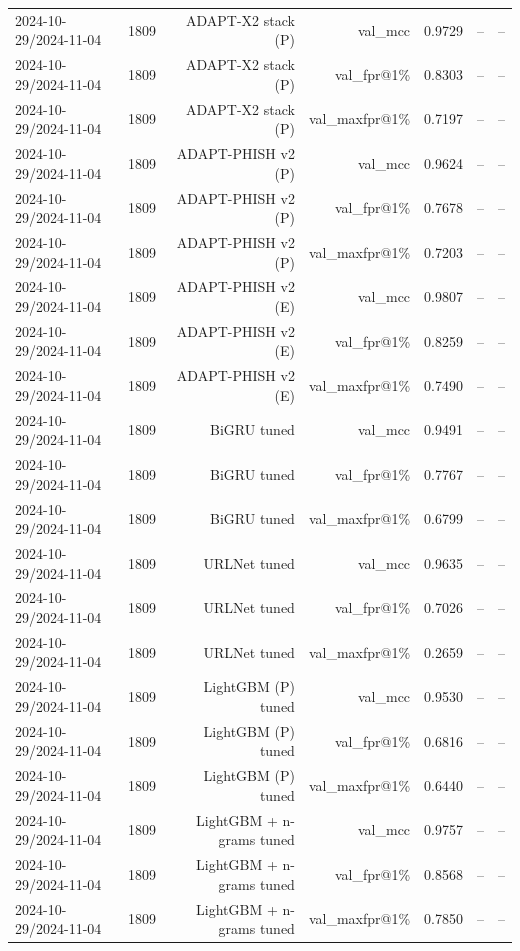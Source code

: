 \begin{table}[t]
\begin{tabular}{llrrrrr}
2024-10-29/2024-11-04 & 1809 & ADAPT-X2 stack (P) & val\_mcc & 0.9729 & -- & -- \\
2024-10-29/2024-11-04 & 1809 & ADAPT-X2 stack (P) & val\_fpr@1\% & 0.8303 & -- & -- \\
2024-10-29/2024-11-04 & 1809 & ADAPT-X2 stack (P) & val\_maxfpr@1\% & 0.7197 & -- & -- \\
2024-10-29/2024-11-04 & 1809 & ADAPT-PHISH v2 (P) & val\_mcc & 0.9624 & -- & -- \\
2024-10-29/2024-11-04 & 1809 & ADAPT-PHISH v2 (P) & val\_fpr@1\% & 0.7678 & -- & -- \\
2024-10-29/2024-11-04 & 1809 & ADAPT-PHISH v2 (P) & val\_maxfpr@1\% & 0.7203 & -- & -- \\
2024-10-29/2024-11-04 & 1809 & ADAPT-PHISH v2 (E) & val\_mcc & 0.9807 & -- & -- \\
2024-10-29/2024-11-04 & 1809 & ADAPT-PHISH v2 (E) & val\_fpr@1\% & 0.8259 & -- & -- \\
2024-10-29/2024-11-04 & 1809 & ADAPT-PHISH v2 (E) & val\_maxfpr@1\% & 0.7490 & -- & -- \\
2024-10-29/2024-11-04 & 1809 & BiGRU tuned & val\_mcc & 0.9491 & -- & -- \\
2024-10-29/2024-11-04 & 1809 & BiGRU tuned & val\_fpr@1\% & 0.7767 & -- & -- \\
2024-10-29/2024-11-04 & 1809 & BiGRU tuned & val\_maxfpr@1\% & 0.6799 & -- & -- \\
2024-10-29/2024-11-04 & 1809 & URLNet tuned & val\_mcc & 0.9635 & -- & -- \\
2024-10-29/2024-11-04 & 1809 & URLNet tuned & val\_fpr@1\% & 0.7026 & -- & -- \\
2024-10-29/2024-11-04 & 1809 & URLNet tuned & val\_maxfpr@1\% & 0.2659 & -- & -- \\
2024-10-29/2024-11-04 & 1809 & LightGBM (P) tuned & val\_mcc & 0.9530 & -- & -- \\
2024-10-29/2024-11-04 & 1809 & LightGBM (P) tuned & val\_fpr@1\% & 0.6816 & -- & -- \\
2024-10-29/2024-11-04 & 1809 & LightGBM (P) tuned & val\_maxfpr@1\% & 0.6440 & -- & -- \\
2024-10-29/2024-11-04 & 1809 & LightGBM + n-grams tuned & val\_mcc & 0.9757 & -- & -- \\
2024-10-29/2024-11-04 & 1809 & LightGBM + n-grams tuned & val\_fpr@1\% & 0.8568 & -- & -- \\
2024-10-29/2024-11-04 & 1809 & LightGBM + n-grams tuned & val\_maxfpr@1\% & 0.7850 & -- & -- \\

\end{tabular}
\end{table}
